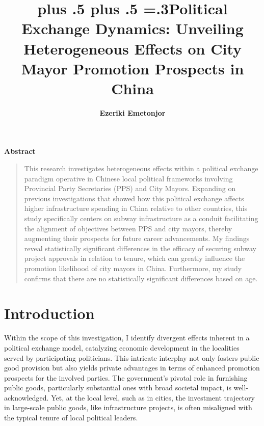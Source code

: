 \documentclass[12pt, ]{article}
\title{\sffamily\bfseries\huge\parfillskip=0pt
\rightskip=0pt plus .5\textwidth
\leftskip=0pt plus .5\textwidth
\emergencystretch=.3\textwidth Political Exchange Dynamics: Unveiling
Heterogeneous Effects on City Mayor Promotion Prospects in China}
\author{\textbf{Ezeriki Emetonjor}
 }
\date{}
\renewenvironment{abstract}{
  \centerline
  {\large\sffamily\bfseries Abstract}\vspace{-1em}
  \begin{quote}\small
}{
  \end{quote}
}
\begin{document}
\allsectionsfont{\sffamily}

\maketitle

\begin{abstract}
This research investigates heterogeneous effects within a political
exchange paradigm operative in Chinese local political frameworks
involving Provincial Party Secretaries (PPS) and City Mayors. Expanding
on previous investigations that showed how this political exchange
affects higher infrastructure spending in China relative to other
countries, this study specifically centers on subway infrastructure as a
conduit facilitating the alignment of objectives between PPS and city
mayors, thereby augmenting their prospects for future career
advancements. My findings reveal statistically significant differences
in the efficacy of securing subway project approvals in relation to
tenure, which can greatly influence the promotion likelihood of city
mayors in China. Furthermore, my study confirms that there are no
statistically significant differences based on age.
\end{abstract}

\ifdefined\Shaded\renewenvironment{Shaded}{\begin{tcolorbox}[borderline west={3pt}{0pt}{shadecolor}, enhanced, boxrule=0pt, interior hidden, sharp corners, frame hidden, breakable]}{\end{tcolorbox}}\fi




\newpage{}

\hypertarget{introduction}{%
\section{Introduction}\label{introduction}}

Within the scope of this investigation, I identify divergent effects
inherent in a political exchange model, catalyzing economic development
in the localities served by participating politicians. This intricate
interplay not only fosters public good provision but also yields private
advantages in terms of enhanced promotion prospects for the involved
parties. The government's pivotal role in furnishing public goods,
particularly substantial ones with broad societal impact, is
well-acknowledged. Yet, at the local level, such as in cities, the
investment trajectory in large-scale public goods, like infrastructure
projects, is often misaligned with the typical tenure of local political
leaders.
\end{document}

